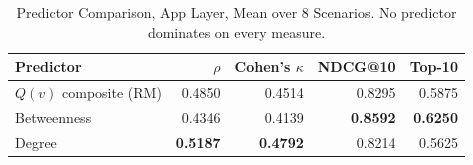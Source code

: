 \begin{table}[htbp]
\centering
\small
\caption{Predictor Comparison, App Layer, Mean over 8 Scenarios. No predictor dominates on every measure.}
\label{tab:predictor_comparison}
\begin{tabular}{lrrrr}
\toprule
\textbf{Predictor} & $\rho$ & \textbf{Cohen's $\kappa$} & \textbf{NDCG@10} & \textbf{Top-10} \\
\midrule
$Q(v)$ composite (RM) & 0.4850 & 0.4514 & 0.8295 & 0.5875 \\
Betweenness & 0.4346 & 0.4139 & \textbf{0.8592} & \textbf{0.6250} \\
Degree & \textbf{0.5187} & \textbf{0.4792} & 0.8214 & 0.5625 \\
\bottomrule
\end{tabular}
\end{table}

